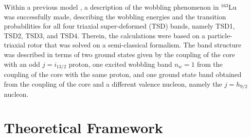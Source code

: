 \documentclass[%
 reprint,
 amsmath,
 amssymb,
 aps,
]{revtex4-2}
\begin{document}
Within a previous model \cite{raduta2020towards}, a description of the wobbling phenomenon in $^{163}$Lu was successfully made, describing the wobbling energies and the transition probabilities for all four triaxial super-deformed (TSD) bands, namely TSD1, TSD2, TSD3, and TSD4. Therein, the calculations were based on a particle-triaxial rotor that was solved on a semi-classical formalism. The band structure was described in terms of two ground states given by the coupling of the core with an odd $j=i_{13/2}$ proton, one excited wobbling band $n_w=1$ from the coupling of the core with the same proton, and one ground state band obtained from the coupling of the core and a different valence nucleon, namely the $j=h_{9/2}$ nucleon.

\section{Theoretical Framework}

\end{document}
